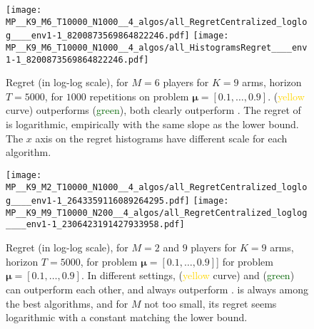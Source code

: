 \begin{figure}[!b]
  \centering
    \texttt{[image: MP\_\_K9\_M6\_T10000\_N1000\_\_4\_algos/all\_RegretCentralized\_loglog\_\_\_\_env1-1\_8200873569864822246.pdf]}
    \texttt{[image: MP\_\_K9\_M6\_T10000\_N1000\_\_4\_algos/all\_HistogramsRegret\_\_\_\_env1-1\_8200873569864822246.pdf]}
  \caption[Regret for $M=6$ players for $K=9$ arms, horizon $T=5000$, for $1000$ repetitions on a fixed problem]{Regret (in log-log scale), for $M=6$ players for $K=9$ arms, horizon $T=5000$, for $1000$ repetitions on problem $\boldsymbol{\mu}=[0.1,\dots,0.9]$. \RandTopM{} (\textcolor{gold}{yellow} curve) outperforms \Selfish{} (\textcolor{darkgreen}{green}), both clearly outperform \rhoRand. The regret of \MCTopM{} is logarithmic, empirically with the same slope as the lower bound. The $x$ axis on the regret histograms have different scale for each algorithm.}
  \label{fig:5:MP__K9_M6_T10000_N1000__4_algos}
\end{figure}


\begin{figure}[!t]
  \centering
      \texttt{[image: MP\_\_K9\_M2\_T10000\_N1000\_\_4\_algos/all\_RegretCentralized\_loglog\_\_\_\_env1-1\_2643359116089264295.pdf]}
      \texttt{[image: MP\_\_K9\_M9\_T10000\_N200\_\_4\_algos/all\_RegretCentralized\_loglog\_\_\_\_env1-1\_2306423191427933958.pdf]}
  \caption[Regret for $M=2$ and $9$ players for $K=9$ arms, horizon $T=5000$, for a fixed problem]{Regret (in log-log scale), for $M=2$ and $9$ players for $K=9$ arms, horizon $T=5000$, for problem $\boldsymbol{\mu}=[0.1,\dots,0.9]$] for problem $\boldsymbol{\mu}=[0.1,\dots,0.9]$. In different settings, \RandTopM{} (\textcolor{gold}{yellow} curve) and \Selfish{} (\textcolor{darkgreen}{green}) can outperform each other, and always outperform \rhoRand. \MCTopM{} is always among the best algorithms, and for $M$ not too small, its regret seems logarithmic with a constant matching the lower bound.}
  \label{fig:5:MP__K9_M2-6-9_T10000_N200__4_algos}
\end{figure}



